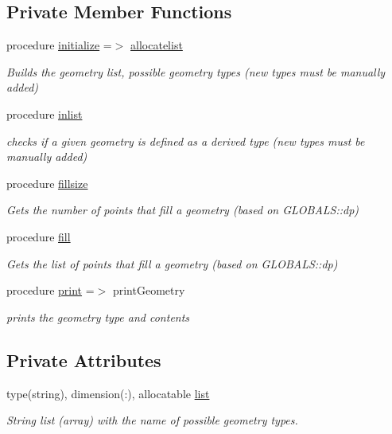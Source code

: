 \subsection*{Private Member Functions}
\begin{DoxyCompactItemize}
\item 
procedure \mbox{\hyperlink{structgeometry__mod_1_1geometry__class_a97a9a90ff4143d41fe57eb0e6d1c76a1}{initialize}} =$>$ \mbox{\hyperlink{namespacegeometry__mod_a1b6f259b0b6be71e02ffae7670f7d8ba}{allocatelist}}
\begin{DoxyCompactList}\small\item\em Builds the geometry list, possible geometry types (new types must be manually added) \end{DoxyCompactList}\item 
procedure \mbox{\hyperlink{structgeometry__mod_1_1geometry__class_a6dfcc19f822da875bebc58c3bf26e999}{inlist}}
\begin{DoxyCompactList}\small\item\em checks if a given geometry is defined as a derived type (new types must be manually added) \end{DoxyCompactList}\item 
procedure \mbox{\hyperlink{structgeometry__mod_1_1geometry__class_a75f5a37d0b38c8baf66ee5089ea44d7a}{fillsize}}
\begin{DoxyCompactList}\small\item\em Gets the number of points that fill a geometry (based on G\+L\+O\+B\+A\+L\+S\+::dp) \end{DoxyCompactList}\item 
procedure \mbox{\hyperlink{structgeometry__mod_1_1geometry__class_a0afee5607f0e2443a862741e40794368}{fill}}
\begin{DoxyCompactList}\small\item\em Gets the list of points that fill a geometry (based on G\+L\+O\+B\+A\+L\+S\+::dp) \end{DoxyCompactList}\item 
procedure \mbox{\hyperlink{structgeometry__mod_1_1geometry__class_afbb83bea5cd3f73708b448d3c732ea7c}{print}} =$>$ print\+Geometry
\begin{DoxyCompactList}\small\item\em prints the geometry type and contents \end{DoxyCompactList}\end{DoxyCompactItemize}
\subsection*{Private Attributes}
\begin{DoxyCompactItemize}
\item 
type(string), dimension(\+:), allocatable \mbox{\hyperlink{structgeometry__mod_1_1geometry__class_a218ff308d9bb94f4386573d7329babc6}{list}}
\begin{DoxyCompactList}\small\item\em String list (array) with the name of possible geometry types. \end{DoxyCompactList}\end{DoxyCompactItemize}


